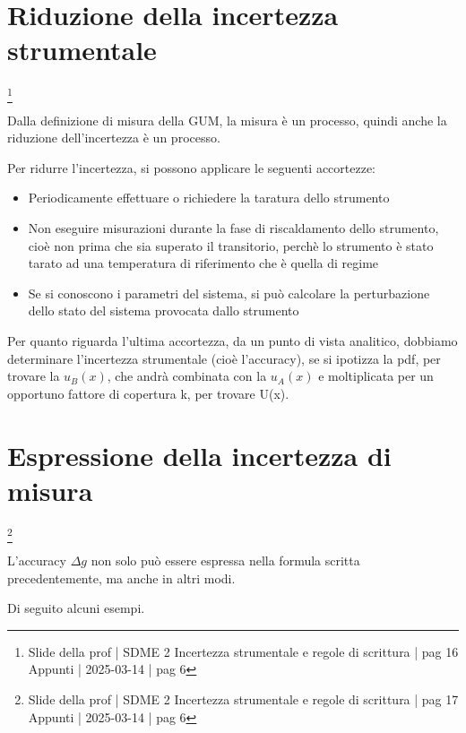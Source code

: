 \newpage 

\section{Riduzione della incertezza strumentale}
\footnote{Slide della prof | SDME 2 Incertezza strumentale e regole di scrittura | pag 16 \\  
Appunti | 2025-03-14 | pag 6}

Dalla definizione di misura della GUM, la misura è un processo, quindi anche la riduzione dell'incertezza è un processo. \newline 

Per ridurre l'incertezza, si possono applicare le seguenti accortezze: 

\begin{itemize}
    \item Periodicamente effettuare o richiedere la taratura dello strumento 
    \item Non eseguire misurazioni durante la fase di riscaldamento dello strumento, cioè non prima che sia superato il transitorio, perchè lo strumento è stato tarato ad una temperatura di riferimento che è quella di regime 
    \item Se si conoscono i parametri del sistema, si può calcolare la perturbazione dello stato del sistema provocata dallo strumento
\end{itemize}


Per quanto riguarda l'ultima accortezza, 
da un punto di vista analitico, 
dobbiamo determinare l'incertezza strumentale (cioè l'accuracy), 
se si ipotizza la pdf, per trovare la $u_{B} (x)$, 
che andrà combinata con la $u_{A} (x)$ e moltiplicata per un opportuno fattore di copertura k, per trovare U(x). \newline 

\newpage 

\section{Espressione della incertezza di misura}
\footnote{Slide della prof | SDME 2 Incertezza strumentale e regole di scrittura | pag 17 \\  
Appunti | 2025-03-14 | pag 6}

L'accuracy $\Delta g$ non solo può essere espressa nella formula scritta precedentemente, ma anche in altri modi. \newline 

Di seguito alcuni esempi. \newline 

